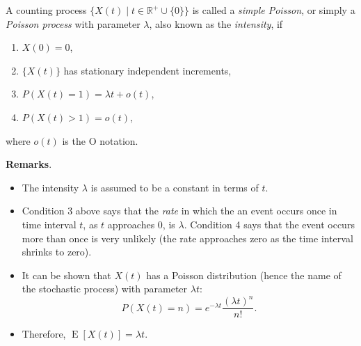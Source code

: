 \documentclass[12pt]{article}
\begin{document}

A counting process $\lbrace X(t)\mid
t\in\mathbb{R}^{+}\cup\lbrace0\rbrace\rbrace$ is called a
\emph{simple Poisson}, or simply a \emph{Poisson process} with
parameter $\lambda$, also known as the \emph{intensity}, if
\begin{enumerate}
\item $X(0)=0$,
\item $\lbrace X(t)\rbrace$ has stationary independent increments,
\item $P(X(t)=1)=\lambda t+o(t)$,
\item $P(X(t)>1)=o(t)$,
\end{enumerate}
where $o(t)$ is the O notation.

\textbf{Remarks}.
\begin{itemize}
\item The intensity $\lambda$ is assumed to be a constant in terms of $t$.
\item Condition 3 above says that the \emph{rate} in which the an event occurs once in time interval $t$, as $t$ approaches 0, is $\lambda$. Condition 4 says that the event occurs more than once is very unlikely (the rate approaches zero as the time interval shrinks to zero).
\item It can be shown that $X(t)$ has a Poisson distribution (hence the name of the stochastic process) with parameter $\lambda t$: $$P(X(t)=n)=e^{-\lambda t}\frac{{(\lambda t)}^n}{n!}.$$
\item Therefore, $\operatorname{E}[X(t)]=\lambda t$.
\end{itemize}
\end{document}

